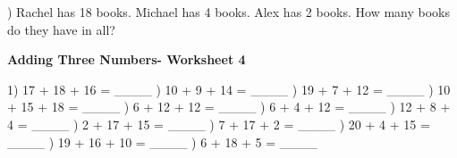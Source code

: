 \documentclass{article}%
\begin{document}
\newline%
\newline%
) Rachel has 18 books. Michael has 4 books. Alex has 2 books. How many books do they have in all?%
\newline%
\newline%
\newline%
\pagebreak%
\large%
\begin{center}%
\textbf{Adding Three Numbers- Worksheet 4}%
\newline%
\end{center} \normalsize%
1) 17 + 18 + 16 = \_\_\_\_%
\newline%
\newline%
) 10 + 9 + 14 = \_\_\_\_%
\newline%
\newline%
) 19 + 7 + 12 = \_\_\_\_%
\newline%
\newline%
) 10 + 15 + 18 = \_\_\_\_%
\newline%
\newline%
) 6 + 12 + 12 = \_\_\_\_%
\newline%
\newline%
) 6 + 4 + 12 = \_\_\_\_%
\newline%
\newline%
) 12 + 8 + 4 = \_\_\_\_%
\newline%
\newline%
) 2 + 17 + 15 = \_\_\_\_%
\newline%
\newline%
) 7 + 17 + 2 = \_\_\_\_%
\newline%
\newline%
) 20 + 4 + 15 = \_\_\_\_%
\newline%
\newline%
) 19 + 16 + 10 = \_\_\_\_%
\newline%
\newline%
) 6 + 18 + 5 = \_\_\_\_%
\end{document}
